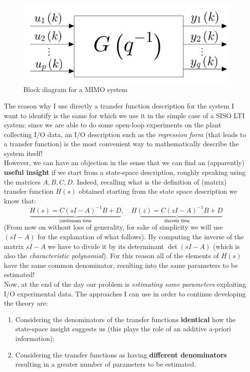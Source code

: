 \begin{figure}[h]
    \centering
    \includegraphics[scale=0.15]{img/MIMO.jpg}
    \caption{Block diagram for a MIMO system}
\end{figure}

\noindent
The reason why I use directly a transfer function description for the system I want to identify is the same for which we use it in the simple case of a SISO LTI system: since we are able to do some open-loop experiments on the plant collecting I/O data, an I/O description such as the \textit{regression form} (that leads to a transfer function) is the most convenient way to mathematically describe the system itself!\\
However, we can have an objection in the sense that we can find an (apparently) \textbf{useful insight} if we start from a state-space description, roughly speaking using the matrices $A,B,C,D$. Indeed, recalling what is the definition of (matrix) transfer function $H(s)$ obtained starting from the state space description we know that:
\begin{equation*}
    \underbrace{H(s)=C(sI-A)^{-1}{B}+D}_{\textsf{continuous time}}, \quad
    \underbrace{H(z)=C(zI-A)^{-1}B+D}_{\textsf{discrete time}} 
\end{equation*}
(From now on without loss of generality, for sake of simplicity we will use $(sI-A)$ for the explanation of what follows).
By computing the inverse of the matrix $sI-A$ we have to divide it by its determinant $\det(sI-A)$ (which is also the \textit{characteristic polynomial}). For this reason all of the elements of $H(s)$ have the same common denominator, resulting into the same parameters to be estimated! \\
Now, at the end of the day our problem is \textit{estimating some parameters} exploiting I/O experimental data. The approaches I can use in order to continue developing the theory are:
\begin{enumerate}
    \itemsep-0.3em
    \item Considering the denominators of the transfer functions \textbf{identical} how the state-space insight suggests us (this plays the role of an additive a-priori information); 
    \item Considering the transfer functions as having \textbf{different denominators} resulting in a greater number of parameters to be estimated.
\end{enumerate}

